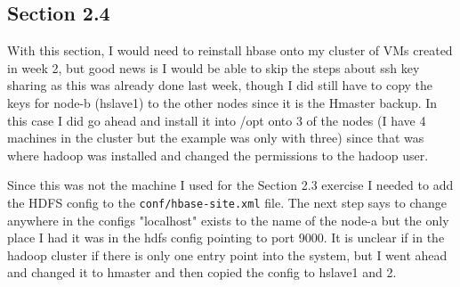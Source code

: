 \documentclass[10pt]{article}
\begin{document}
\subsection*{Section 2.4}
With this section, I would need to reinstall hbase onto my cluster of VMs created in week 2, but good news is I would be able to skip the steps about ssh key sharing as this was already done last week, though I did still have to copy the keys for node-b (hslave1) to the other nodes since it is the Hmaster backup. In this case I did go ahead and install it into /opt onto 3 of the nodes (I have 4 machines in the cluster but the example was only with three) since that was where hadoop was installed and changed the permissions to the hadoop user. 
\par
{}%
\hfill
{}%
\par
Since this was not the machine I used for the Section 2.3 exercise I needed to add the HDFS config to the \verb|conf/hbase-site.xml| file. The next step says to change anywhere in the configs "localhost" exists to the name of the node-a but the only place I had it was in the hdfs config pointing to port 9000. It is unclear if in the hadoop cluster if there is only one entry point into the system, but I went ahead and changed it to hmaster and then copied the config to hslave1 and 2. 
\pagebreak
\end{document}
